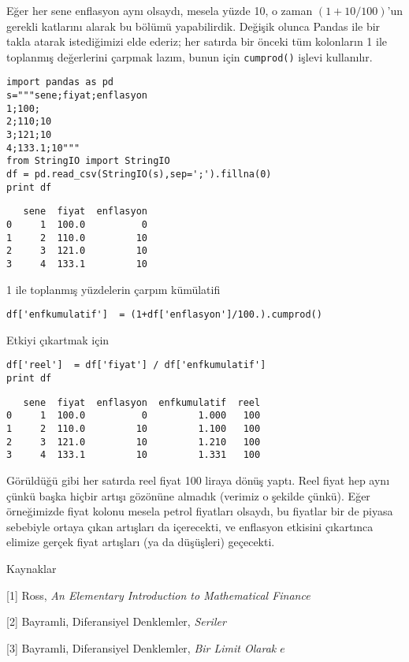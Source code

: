 \documentclass[12pt,fleqn]{article}\usepackage{../../common}
\begin{document}
Eğer her sene enflasyon aynı olsaydı, mesela yüzde 10, o zaman
$(1+10/100)$'un gerekli katlarını alarak bu bölümü yapabilirdik. Değişik
olunca Pandas ile bir takla atarak istediğimizi elde ederiz; her satırda
bir önceki tüm kolonların 1 ile toplanmış değerlerini çarpmak lazım, bunun
için \verb!cumprod()! işlevi kullanılır.

\begin{verbatim}
import pandas as pd
s="""sene;fiyat;enflasyon
1;100;
2;110;10   
3;121;10   
4;133.1;10"""
from StringIO import StringIO
df = pd.read_csv(StringIO(s),sep=';').fillna(0)
print df
\end{verbatim}

\begin{verbatim}
   sene  fiyat  enflasyon
0     1  100.0          0
1     2  110.0         10
2     3  121.0         10
3     4  133.1         10
\end{verbatim}

1 ile toplanmış yüzdelerin çarpım kümülatifi

\begin{verbatim}
df['enfkumulatif']  = (1+df['enflasyon']/100.).cumprod()
\end{verbatim}

Etkiyi çıkartmak için

\begin{verbatim}
df['reel']  = df['fiyat'] / df['enfkumulatif']
print df
\end{verbatim}

\begin{verbatim}
   sene  fiyat  enflasyon  enfkumulatif  reel
0     1  100.0          0         1.000   100
1     2  110.0         10         1.100   100
2     3  121.0         10         1.210   100
3     4  133.1         10         1.331   100
\end{verbatim}

Görüldüğü gibi her satırda reel fiyat 100 liraya dönüş yaptı. Reel fiyat
hep aynı çünkü başka hiçbir artışı gözönüne almadık (verimiz o şekilde
çünkü). Eğer örneğimizde fiyat kolonu mesela petrol fiyatları olsaydı, bu
fiyatlar bir de piyasa sebebiyle ortaya çıkan artışları da içerecekti, ve
enflasyon etkisini çıkartınca elimize gerçek fiyat artışları (ya da
düşüşleri) geçecekti.

Kaynaklar

[1] Ross, {\em An Elementary Introduction to Mathematical Finance}

[2] Bayramli, Diferansiyel Denklemler, {\em Seriler}

[3] Bayramli, Diferansiyel Denklemler, {\em Bir Limit Olarak $e$}
\end{document}
